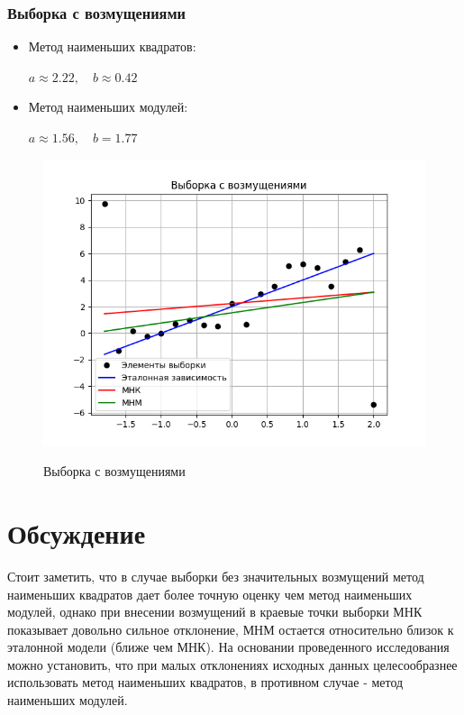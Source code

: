 \documentclass[12pt,a4paper]{article}
\begin{document}
			\subsubsection{Выборка с возмущениями}
				\begin{itemize}
					\item Метод наименьших квадратов:
					\begin{center}
						$a \approx 2.22, \quad b \approx 0.42$
					\end{center}
					\item Метод наименьших модулей:
					\begin{center}
						$a \approx 1.56, \quad b=1.77$
					\end{center}
				\end{itemize}
				\begin{figure}[h!]
					{\includegraphics[width=1\linewidth]{../plots/altered.png}}
					\caption{Выборка с возмущениями}
				\end{figure}
			\clearpage
			\section{Обсуждение}
			Стоит заметить, что в случае выборки без значительных возмущений метод наименьших квадратов дает более точную оценку чем метод наименьших модулей, однако при внесении возмущений в краевые точки выборки МНК показывает довольно сильное отклонение, МНМ остается относительно близок к эталонной модели (ближе чем МНК). На основании проведенного исследования можно установить, что при малых отклонениях исходных данных целесообразнее использовать метод наименьших квадратов, в противном случае - метод наименьших модулей.
			\newpage
\end{document}
